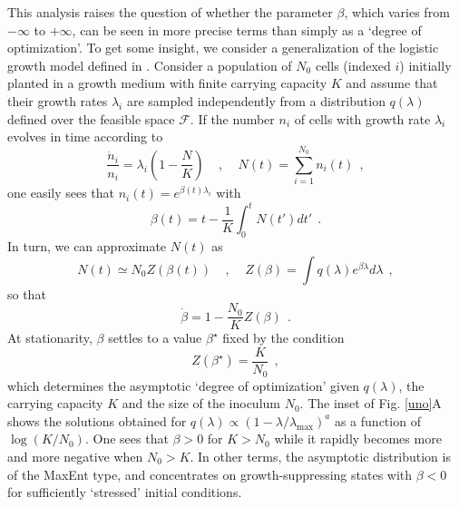 \documentclass[superscriptaddress,amsmath,amssymb,twocolumn]{revtex4-1}
\begin{document}
This analysis raises the question of whether the parameter $\beta$, which varies from $-\infty$ to $+\infty$, can be seen in more precise terms than simply as a `degree of optimization'. To get some insight, we consider a generalization of the logistic growth model defined in \cite{bara}. Consider a population of $N_0$ cells (indexed $i$) initially planted in a growth medium with finite carrying capacity $K$ and assume that their growth rates $\lambda_i$ are sampled independently from a distribution $q(\lambda)$ defined over the feasible space $\mathcal{F}$. If the number $n_i$ of cells with growth rate $\lambda_i$ evolves in time according to
\begin{equation}
\frac{\dot n_i}{n_i}=\lambda_i\left(1-\frac{N}{K}\right)~~~~~,~~~~~ N(t)=\sum_{i=1}^{N_0} n_i(t)~~,
\end{equation}
one easily sees that $n_i(t)=e^{\beta(t)\lambda_i}$ with
\begin{equation}
\beta(t)=t-\frac{1}{K}\int_0^t N(t')dt'~~.
\end{equation}
In turn, we can approximate $N(t)$ as
\begin{equation}
N(t)\simeq N_0 Z(\beta(t))~~~~~,~~~~~Z(\beta)=\int q(\lambda) e^{\beta \lambda}d\lambda~~,
\end{equation}
so that
\begin{equation}
\dot\beta=1-\frac{N_0}{K}Z(\beta)~~.
\end{equation}
At stationarity, $\beta$ settles to a value $\beta^\star$ fixed by the condition
\begin{equation}\label{betastar}
Z(\beta^\star)=\frac{K}{N_0}~~,
\end{equation}
which determines the asymptotic `degree of optimization' given $q(\lambda)$, the carrying capacity $K$ and the size of the inoculum $N_0$. The inset of Fig. \ref{uno}A shows the solutions obtained for $q(\lambda)\propto(1-\lambda/\lambda_{\max})^a$ \cite{physbio} as a function of $\log(K/N_0)$. One sees that $\beta>0$ for $K>N_0$ while it rapidly becomes more and more negative when $N_0>K$. In other terms, the asymptotic distribution is of the MaxEnt type, and concentrates on growth-suppressing states with $\beta<0$ for sufficiently `stressed' initial conditions.
\end{document}
